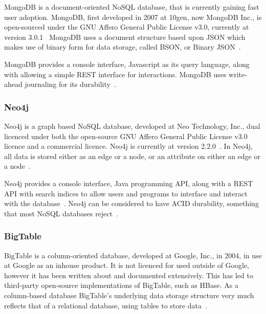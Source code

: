 \documentclass{article}
\begin{document}
MongoDB is a document-oriented NoSQL database, that is currently gaining fast user adoption. MongoDB,
first developed in 2007 at 10gen, now MongoDB Inc., is open-sourced under the GNU Affero General Public License v3.0, 
currently at version 3.0.1~\cite{6_mongodb.org_2015} MongoDB uses a document structure based upon
JSON which makes use of binary form for data storage, called BSON, or Binary JSON~\cite{1_mongo_docs_2015}.

MongoDB provides a console interface, Javascript as its query language, along with allowing a simple REST
interface for interactions. MongoDB uses write-ahead journaling for its durability~\cite{redmond2012seven}.



\subsubsection{Neo4j} %
\label{ssub:neo4j}

Neo4j is a graph based NoSQL database, developed at Neo Technology, Inc., dual licenced under both the open-source
GNU Affero General Public License v3.0 licence and a commercial licence. Neo4j is currently at version 2.2.0~\cite{2_neo4j}.
In Neo4j, all data is stored either as an edge or a node, or an attribute on either an edge or a node~\cite{1_neo4j}. 

Neo4j provides a console interface, Java programming API, along with a REST API with search indices to allow users and programs to interface and 
interact with the database~\cite{redmond2012seven}. Neo4j can be considered to have ACID durability, something that
most NoSQL databases reject~\cite{redmond2012seven}.





\subsubsection{BigTable} %
\label{ssub:bigtable}

BigTable is a column-oriented database, developed at Google, Inc., in 2004, in use at Google as an inhouse product.
It is not licenced for used outside of Google, however it has been written about and documented extensively.
This has led to third-party open-source implementations of BigTable, such as HBase. As a column-based database
BigTable's underlying data storage structure very much reflects that of a relational database, using
tables to store data~\cite{chang2008bigtable}.
\end{document}
